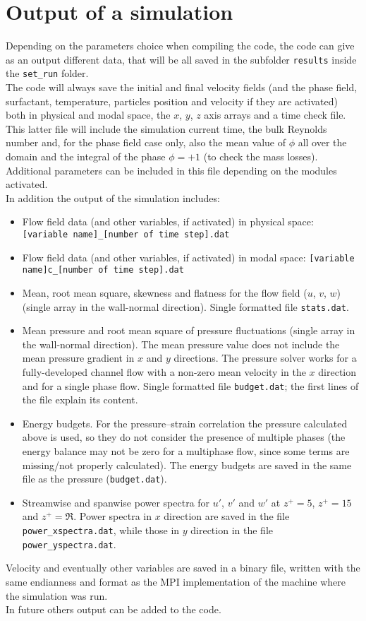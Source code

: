 \section{Output of a simulation}
Depending on the parameters choice when compiling the code, the code can give as an output different data, that will be all saved in the subfolder \texttt{results} inside the \texttt{set\_run} folder.\\
The code will always save the initial and final velocity fields (and the phase field, surfactant, temperature, particles position and velocity if they are activated) both in physical and modal space, the $x$, $y$, $z$ axis arrays and a time check file. 
This latter file will include the simulation current time, the bulk Reynolds number and, for the phase field case only, also the mean value of $\phi$ all over the domain and the integral of the phase $\phi=+1$ (to check the mass losses).
Additional parameters can be included in this file depending on the modules activated.\\
In addition the output of the simulation includes:
\begin{itemize}
\item Flow field data (and other variables, if activated) in physical space: \texttt{[variable name]\_[number of time step].dat}
\item Flow field data (and other variables, if activated) in modal space: \texttt{[variable name]c\_[number of time step].dat}
\item Mean, root mean square, skewness and flatness for the flow field ($u$, $v$, $w$) (single array in the wall-normal direction). Single formatted file \texttt{stats.dat}.
\item Mean pressure and root mean square of pressure fluctuations (single array in the wall-normal direction). The mean pressure value does not include the mean pressure gradient in $x$ and $y$ directions. The pressure solver works for a fully-developed channel flow with a non-zero mean velocity in the $x$ direction and for a single phase flow. Single formatted file \texttt{budget.dat}; the first lines of the file explain its content.
\item Energy budgets. For the pressure--strain correlation the pressure calculated above is used, so they do not consider the presence of multiple phases (the energy balance may not be zero for a multiphase flow, since some terms are missing/not properly calculated). The energy budgets are saved in the same file as the pressure (\texttt{budget.dat}).
\item Streamwise and spanwise power spectra for $u'$, $v'$ and $w'$ at $z^+=5$, $z^+=15$ and $z^+=\Re$. Power spectra in $x$ direction are saved in the file \texttt{power\_xspectra.dat}, while those in $y$ direction in the file \texttt{power\_yspectra.dat}.
\end{itemize}
Velocity and eventually other variables are saved in a binary file, written with the same endianness and format as the MPI implementation of the machine where the simulation was run.\\
In future others output can be added to the code.

